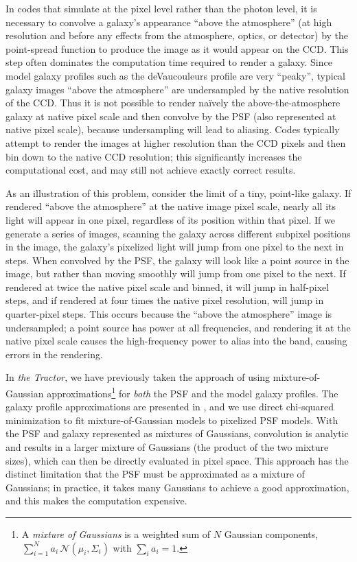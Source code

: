 \documentclass[11pt,preprint]{aastex}
\newcommand{\project}[1]{\textsl{#1}}
\begin{document}

In codes that simulate at the pixel level rather than the photon
level, it is necessary to convolve a galaxy's appearance ``above the
atmosphere'' (at high resolution and before any effects from the
atmosphere, optics, or detector) by the point-spread function to
produce the image as it would appear on the CCD.  This step often
dominates the computation time required to render a galaxy.  Since
model galaxy profiles such as the deVaucouleurs profile are very
``peaky'', typical galaxy images ``above the atmosphere'' are
undersampled by the native resolution of the CCD.  Thus it is not
possible to render na\"ively the above-the-atmosphere galaxy at native
pixel scale and then convolve by the PSF (also represented at native
pixel scale), because undersampling will lead to aliasing.
Codes typically attempt to render the images at higher resolution than the
CCD pixels and then bin down to the native CCD resolution; this
significantly increases the computational cost, and may still not
achieve exactly correct results.



As an illustration of this problem, consider the limit of a tiny,
point-like galaxy.  If rendered ``above the atmosphere'' at the native
image pixel scale, nearly all its light will appear in one pixel,
regardless of its position within that pixel.  If we generate a series
of images, scanning the galaxy across different subpixel positions in
the image, the galaxy's pixelized light will jump from one pixel to
the next in steps.  When convolved by the PSF, the galaxy will look
like a point source in the image, but rather than moving smoothly will
jump from one pixel to the next.  If rendered at twice the native pixel
scale and binned, it will jump in half-pixel steps, and if rendered at
four times the native pixel resolution, will jump in quarter-pixel
steps.  This occurs because the ``above the atmosphere'' image is
undersampled; a point source has power at all frequencies, and
rendering it at the native pixel scale causes the high-frequency power
to alias into the band, causing errors in the rendering.


In \project{the Tractor}, we have previously taken the approach of
using mixture-of-Gaussian approximations\footnote{
  A \emph{mixture of Gaussians} is a weighted sum of $N$ Gaussian
  components, $\sum_{i=1}^N a_i \, \mathcal{N}(\mu_i, \Sigma_i)$
  with $\sum_i a_i = 1$.}
for \emph{both} the PSF and
the model galaxy profiles.  The galaxy profile approximations are
presented in \cite{moggalaxy}, and we use direct chi-squared
minimization to fit mixture-of-Gaussian models to pixelized PSF
models.  With the PSF and galaxy represented as mixtures of Gaussians,
convolution is analytic and results in a larger mixture of Gaussians
(the product of the two mixture sizes), which can then be directly
evaluated in pixel space.  This approach has the distinct limitation
that the PSF must be approximated as a mixture of Gaussians; in
practice, it takes many Gaussians to achieve a good approximation, and
this makes the computation expensive.
\end{document}

